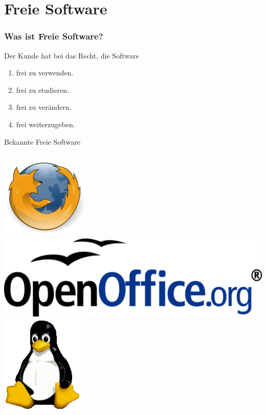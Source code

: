 \documentclass{beamer}
\newlength{\px}
\begin{document}
\section{Freie Software}

\begin{frame}
\frametitle{Was ist Freie Software?}

Der Kunde hat bei das Recht, die Software
\begin{enumerate}
\item frei zu verwenden.
\item frei zu studieren.
\item frei zu verändern.
\item frei weiterzugeben.
\end{enumerate}

\begin{block}{Bekannte Freie Software}
\begin{center}
\hfill
\includegraphics[height=120\px]{firefox}
\hfill
\includegraphics[height=120\px]{openoffice}
\hfill
\includegraphics[height=120\px]{tux}
\hfill
\strut
\end{center}
\end{block}

\end{frame}
\end{document}
